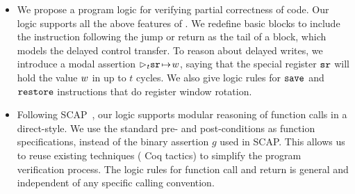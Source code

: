 
\begin{itemize}
	\item
    We propose a program logic for verifying partial 
    correctness of \sparc{} code.   
    Our logic supports all the above features of \sparc.
    We redefine basic blocks to include the instruction
    following the jump or return as the tail of a
    block, which models the delayed control
    transfer. To reason about delayed writes, we introduce
    a modal assertion $\rhd_{t}{\texttt{sr}} \!\mapsto\! {w}$, saying that
    the special register $\texttt{sr}$ will
    hold the value $w$ in up to $t$ cycles.
    We also give
    logic rules for $\texttt{save}$ and $\texttt{restore}$ instructions 
    that do register window rotation.
%
%
	
	\item
    Following SCAP~\cite{Feng06pldi}, our logic supports
    modular reasoning of function calls in a direct-style.
    We use the standard pre- and post-conditions as function
    specifications, instead of the binary assertion $g$ used
    in SCAP. This allows us to reuse existing techniques
    (\eg{} Coq tactics) to simplify the program
    verification process.
    The logic rules for function call and return is general
    and independent of any specific calling convention.
	

\end{itemize}
